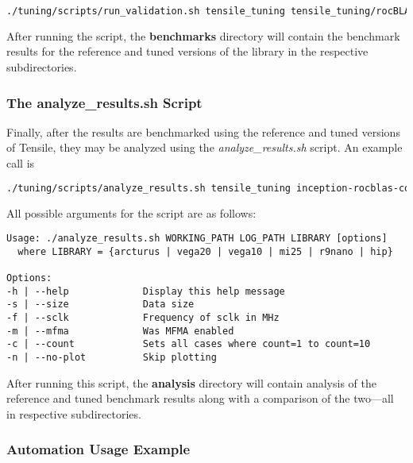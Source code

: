 \documentclass[]{article}
\begin{document}
\begin{lstlisting}[language=bash,breaklines=true]
./tuning/scripts/run_validation.sh tensile_tuning tensile_tuning/rocBLAS/
\end{lstlisting}

After running the script, the \textbf{benchmarks} directory will contain the benchmark results for the reference and tuned versions of the library in the respective subdirectories.

\subsubsection{The analyze\_results.sh Script}

Finally, after the results are benchmarked using the reference and tuned versions of Tensile, they may be analyzed using the \emph{analyze\_results.sh} script. An example call is

\begin{lstlisting}[language=bash,breaklines=true]
./tuning/scripts/analyze_results.sh tensile_tuning inception-rocblas-configs_unique.log vega20 -s 2 -f 1301
\end{lstlisting}

\noindent
All possible arguments for the script are as follows:

\begin{lstlisting}
Usage: ./analyze_results.sh WORKING_PATH LOG_PATH LIBRARY [options]
  where LIBRARY = {arcturus | vega20 | vega10 | mi25 | r9nano | hip}

Options:
-h | --help             Display this help message
-s | --size             Data size
-f | --sclk             Frequency of sclk in MHz
-m | --mfma             Was MFMA enabled
-c | --count            Sets all cases where count=1 to count=10
-n | --no-plot          Skip plotting
\end{lstlisting}

After running this script, the \textbf{analysis} directory will contain analysis of the reference and tuned benchmark results along with a comparison of the two---all in respective subdirectories.

\subsubsection{Automation Usage Example}
\end{document}
